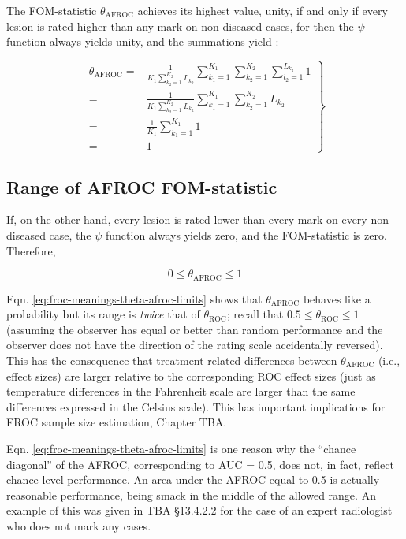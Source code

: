 \documentclass[
]{book}
\begin{document}
The FOM-statistic \(\theta_{\text{AFROC}}\) achieves its highest value, unity, if and only if every lesion is rated higher than any mark on non-diseased cases, for then the \(\psi\) function always yields unity, and the summations yield :

\begin{equation}
\left. 
\begin{aligned}
\theta_{\text{AFROC}}=& \frac{1}{K_1 \sum_{k_2=1}^{K_2}L_{k_2}}\sum_{k_1=1}^{K_1}\sum_{k_2=1}^{K_2}\sum_{l_2=1}^{L_{k_2}}  1 \\
= & \frac{1}{K_1 \sum_{k_2=1}^{K_2}L_{k_2}}\sum_{k_1=1}^{K_1}\sum_{k_2=1}^{K_2}L_{k_2} \\
= & \frac{1}{K_1}\sum_{k_1=1}^{K_1}1\\
= & 1
\end{aligned}
\right \}
\label{eq:froc-meanings-theta-afroc-unity}
\end{equation}

\hypertarget{range-of-afroc-fom-statistic}{%
\subsection{Range of AFROC FOM-statistic}\label{range-of-afroc-fom-statistic}}

If, on the other hand, every lesion is rated lower than every mark on every non-diseased case, the \(\psi\) function always yields zero, and the FOM-statistic is zero. Therefore,

\begin{equation}
0 \leq \theta_{\text{AFROC}} \leq 1
\label{eq:froc-meanings-theta-afroc-limits}
\end{equation}

Eqn. \eqref{eq:froc-meanings-theta-afroc-limits} shows that \(\theta_{\text{AFROC}}\) behaves like a probability but its range is \emph{twice} that of \(\theta_{\text{ROC}}\); recall that \(0.5 \leq \theta_{\text{ROC}} \leq 1\) (assuming the observer has equal or better than random performance and the observer does not have the direction of the rating scale accidentally reversed). This has the consequence that treatment related differences between \(\theta_{\text{AFROC}}\) (i.e., effect sizes) are larger relative to the corresponding ROC effect sizes (just as temperature differences in the Fahrenheit scale are larger than the same differences expressed in the Celsius scale). This has important implications for FROC sample size estimation, Chapter TBA.

Eqn. \eqref{eq:froc-meanings-theta-afroc-limits} is one reason why the ``chance diagonal'' of the AFROC, corresponding to AUC = 0.5, does not, in fact, reflect chance-level performance. An area under the AFROC equal to 0.5 is actually reasonable performance, being smack in the middle of the allowed range. An example of this was given in TBA §13.4.2.2 for the case of an expert radiologist who does not mark any cases.
\end{document}
